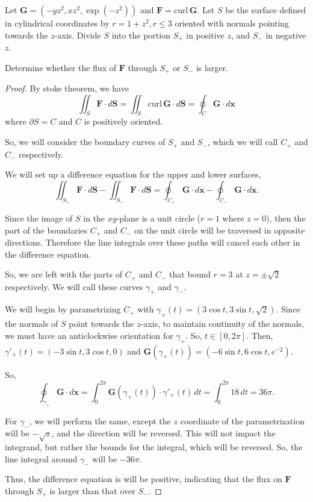 \documentclass[../hw10]{subfiles}
\begin{document}
\begin{problem}[5]
Let $\mathbf{G} = (-yz^2,xz^2,\exp{(-z^2)})$ and $\mathbf{F}=\text{curl}\,\mathbf{G}$.
Let $S$ be the surface defined in cylindrical coordinates by  $r=1+z^2, r\le 3$ oriented with normals pointing towards the $z$-axis.
Divide  $S$ into the portion  $S_+$ in positive  $z$, and  $S_-$ in negative  $z$.

Determine whether the flux of  $\mathbf{F}$ through $S_+$ or  $S_-$ is larger.
\end{problem}
\begin{proof}
	By stoke theorem, we have \[
		\iint_S \mathbf{F}\cdot d\mathbf{S} = \iint_S \text{curl}\,\mathbf{G}\cdot d\mathbf{S} = \oint_C \mathbf{G}\cdot d\mathbf{x}
	\] where $\partial{S}=C$ and $C$ is positively oriented.

	So, we will consider the boundary curves of $S_+$ and $S_-$, which we will call $C_+$ and  $C_-$ respectively.

	We will set up a difference equation for the upper and lower surfaces, \[
		\iint_{S_+}\mathbf{F}\cdot d\mathbf{S}-\iint_{S_-}\mathbf{F}\cdot d\mathbf{S}
		= \oint_{C_+}\mathbf{G}\cdot d\mathbf{x}-\oint_{C_-}\mathbf{G}\cdot d\mathbf{x}
		.\]

	Since the image of $S$ in the $xy$-plane is a unit circle ($r=1$ where $z=0$), then the part of the boundaries $C_+$ and $C_-$ on the unit circle will be traversed in opposite directions.
	Therefore the line integrals over these paths will cancel each other in the difference equation.

	So, we are left with the parts of $C_+$ and  $C_-$ that bound $r=3$ at $z= \pm \sqrt{2} $ respectively.
	We will call these curves $\gamma_+$ and  $\gamma_-$.

	We will begin by parametrizing $C_+$ with $\gamma_+(t)=(3\cos{t},3\sin{t},\sqrt{2})$.
	Since the normals of $S$ point towards the  $z$-axis, to maintain continuity of the normals, we must have an anticlockwise orientation for  $\gamma_+$.
	So, $t\in [0,2\pi]$.
	Then, $\gamma'_+(t)=(-3\sin{t},3\cos{t},0)$ and
	$\mathbf{G}(\gamma_+(t))=(-6\sin{t},6\cos{t},e^{-2})$.

	So, \[
		\oint_{\gamma_+}\mathbf{G}\cdot d\mathbf{x}
		= \int_{0}^{2\pi} \mathbf{G}(\gamma_+(t))\cdot \gamma'_+(t) \,dt
		= \int_{0}^{2\pi} 18 \,dt
		= 36\pi
		.\]

	For $\gamma_-$, we will perform the same, except the  $z$ coordinate of the parametrization will be  $-\sqrt{z}$, and the direction will be reversed.
	This will not impact the integrand, but rather the bounds for the integral, which will be reversed.
	So, the line integral around $\gamma_-$ will be  $-36\pi$.

	Thus, the difference equation is will be positive, indicating that the flux on $\mathbf{F}$ through $S_+$ is larger than that over $S_-$.
\end{proof}
\end{document}
